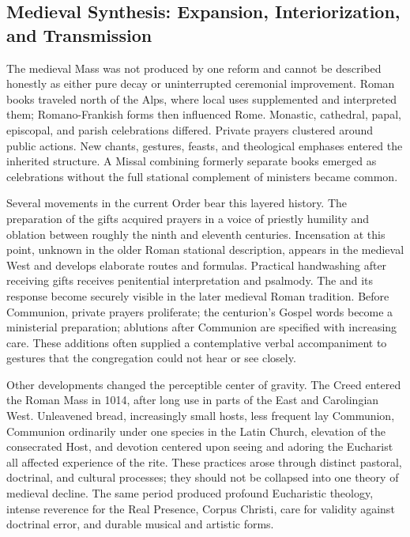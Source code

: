 \subsection{Medieval Synthesis: Expansion, Interiorization, and Transmission}

The medieval Mass was not produced by one reform and cannot be described honestly as either pure decay or uninterrupted ceremonial improvement. Roman books traveled north of the Alps, where local uses supplemented and interpreted them; Romano-Frankish forms then influenced Rome. Monastic, cathedral, papal, episcopal, and parish celebrations differed. Private prayers clustered around public actions. New chants, gestures, feasts, and theological emphases entered the inherited structure. A Missal combining formerly separate books emerged as celebrations without the full stational complement of ministers became common.

Several movements in the current Order bear this layered history. The preparation of the gifts acquired prayers in a voice of priestly humility and oblation between roughly the ninth and eleventh centuries. Incensation at this point, unknown in the older Roman stational description, appears in the medieval West and develops elaborate routes and formulas. Practical handwashing after receiving gifts receives penitential interpretation and psalmody. The  and its response become securely visible in the later medieval Roman tradition. Before Communion, private prayers proliferate; the centurion's Gospel words become a ministerial preparation; ablutions after Communion are specified with increasing care. These additions often supplied a contemplative verbal accompaniment to gestures that the congregation could not hear or see closely.

Other developments changed the perceptible center of gravity. The Creed entered the Roman Mass in 1014, after long use in parts of the East and Carolingian West. Unleavened bread, increasingly small hosts, less frequent lay Communion, Communion ordinarily under one species in the Latin Church, elevation of the consecrated Host, and devotion centered upon seeing and adoring the Eucharist all affected experience of the rite. These practices arose through distinct pastoral, doctrinal, and cultural processes; they should not be collapsed into one theory of medieval decline. The same period produced profound Eucharistic theology, intense reverence for the Real Presence, Corpus Christi, care for validity against doctrinal error, and durable musical and artistic forms.

